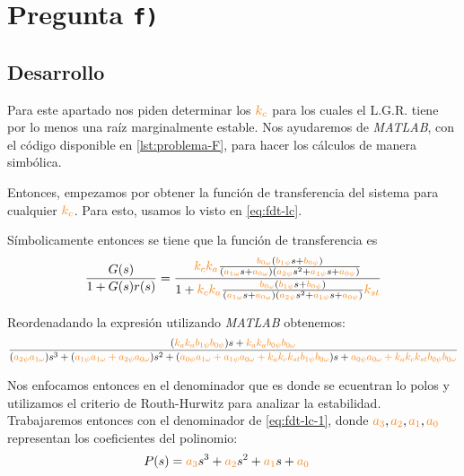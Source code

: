 \section{Pregunta \texttt{f)}}\label{pregunta-f}
\subsection{Desarrollo}

Para este apartado nos piden determinar los $\nara{k_{c}}$ para los cuales el L.G.R. tiene por lo menos una raíz marginalmente estable. Nos ayudaremos de \textit{MATLAB}, con
el código disponible en \autoref{lst:problema-F}, para hacer los cálculos
de manera simbólica.

Entonces, empezamos por obtener la función de transferencia del sistema para
cualquier $\nara{k_{c}}$. Para esto, usamos lo visto en \eqref{eq:fdt-lc}.

Símbolicamente entonces se tiene que la función de transferencia es
\begin{equation}
    \frac{G(s)}{1 + G(s)r(s)} = \dfrac{\nara{k_ck_a} \frac{\nara{\nara{b_{0\omega}}}\left(\nara{b_{1\psi}}s + \nara{b_{0\psi}}\right)}
    {\left(\nara{a_{1\omega}}s + \nara{a_{0\omega}}\right)\left(\nara{a_{2\psi}}s^{2} + \nara{a_{1\psi}}s + \nara{a_{0\psi}}\right)}}{1+\nara{k_ck_a} \frac{\nara{\nara{b_{0\omega}}}\left(\nara{b_{1\psi}}s + \nara{b_{0\psi}}\right)}
    {\left(\nara{a_{1\omega}}s + \nara{a_{0\omega}}\right)\left(\nara{a_{2\psi}}s^{2} + \nara{a_{1\psi}}s + \nara{a_{0\psi}}\right)}\nara{k_{st}}}
\end{equation}

Reordenadando la expresión utilizando \textit{MATLAB} obtenemos:
\begin{equation}\label{eq:fdt-lc-1}
    \frac{(\nara{k_a k_a b_{1\psi} b_{0\psi}})s + \nara{k_a k_a b_{0\psi} b_{0\omega}}}
    {(\nara{a_{2\psi} a_{1\omega}})s^3 + (\nara{a_{1\psi} a_{1\omega} + a_{2\psi} a_{0\omega}})s^2 + (\nara{a_{0\psi} a_{1\omega} + a_{1\psi} a_{0\omega} + k_a k_c k_{st} b_{1\psi} b_{0\omega}})s + \nara{a_{0\psi} a_{0\omega} + k_a k_c k_{st} b_{0\psi} b_{0\omega}}}
\end{equation}

Nos enfocamos entonces en el denominador que es donde se ecuentran lo polos y
utilizamos el criterio de Routh-Hurwitz para analizar la estabilidad. Trabajaremos
entonces con el denominador de \eqref{eq:fdt-lc-1}, donde $\nara{a_3},\nara{a_2},\nara{a_1},\nara{a_0}$
representan los coeficientes del polinomio:
\begin{align}
    P(s) = \nara{a_3} s^3 + \nara{a_2} s^2 + \nara{a_1} s + \nara{a_0} &
\end{align}

